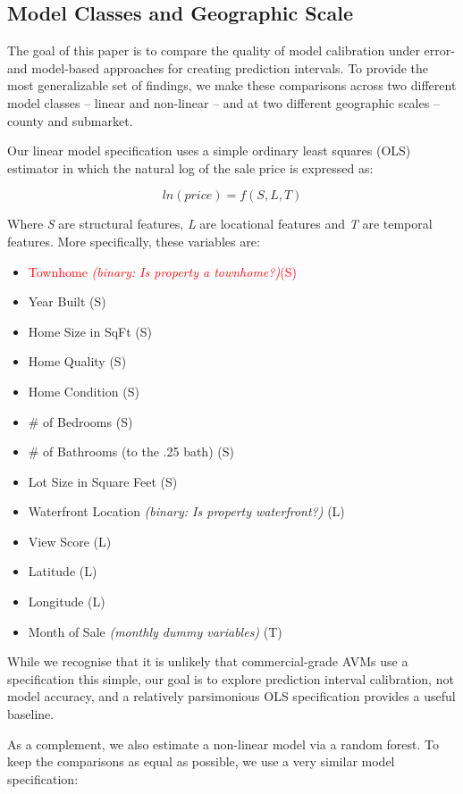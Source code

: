 \documentclass[colTwo]{anon}
\theoremstyle{definition}
\begin{document}
\subsection{Model Classes and Geographic Scale}

The goal of this paper is to compare the quality of model calibration under error- and model-based approaches for creating prediction intervals.  To provide the most generalizable set of findings, we make these comparisons across two different model classes -- linear and non-linear -- and at two different geographic scales -- county and submarket.  

Our linear model specification uses a simple ordinary least squares (OLS) estimator in which the natural log of the sale price is expressed as:

\[ln(price) = f(S, L, T)\]

Where \textit{S} are structural features, \textit{L} are locational features and \textit{T} are temporal features.  More specifically, these variables are:

\begin{itemize}
\item \textcolor{red}{Townhome \textit{(binary: Is property a townhome?)}(S)}
\item Year Built (S)
\item Home Size in SqFt (S)
\item Home Quality (S)
\item Home Condition (S)
\item \# of Bedrooms (S)
\item \# of Bathrooms (to the .25 bath) (S)
\item Lot Size in Square Feet (S)
\item Waterfront Location \textit{(binary: Is property waterfront?)} (L)
\item View Score (L)
\item Latitude (L)
\item Longitude (L)
\item Month of Sale \textit{(monthly dummy variables)} (T) 
\end{itemize}

While we recognise that it is unlikely that commercial-grade AVMs use a specification this simple, our goal is to explore prediction interval calibration, not model accuracy, and a relatively parsimonious OLS specification provides a useful baseline.  

As a complement, we also estimate a non-linear model via a random forest.  To keep the comparisons as equal as possible, we use a very similar model specification:
\end{document}
